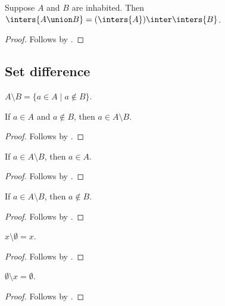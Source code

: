 \begin{proposition}\label{inters_distrib_union}
    Suppose $A$ and $B$ are inhabited.
    Then $\inters{A\union B} = (\inters{A})\inter\inters{B}$.
\end{proposition}
\begin{proof}
    Follows by .
\end{proof}

\subsection{Set difference}

\begin{definition}\label{setminus}
    $A\setminus B = \{ a \in A \mid a\not\in B\}$.
\end{definition}

\begin{proposition}\label{setminus_intro}
    If $a\in A$ and $a\notin B$, then $a\in A\setminus B$.
\end{proposition}
\begin{proof}
    Follows by .
\end{proof}

\begin{proposition}\label{setminus_elim_left}
    If $a\in A\setminus B$, then $a\in A$.
\end{proposition}
\begin{proof}
    Follows by .
\end{proof}

\begin{proposition}\label{setminus_elim_right}
    If $a\in A\setminus B$, then $a\notin B$.
\end{proposition}
\begin{proof}
    Follows by .
\end{proof}

\begin{proposition}\label{setminus_emptyset}
    $x\setminus \emptyset = x$.
\end{proposition}
\begin{proof}
    Follows by .
\end{proof}

\begin{proposition}\label{emptyset_setminus}
    $\emptyset\setminus x = \emptyset$.
\end{proposition}
\begin{proof}
    Follows by .
\end{proof}

